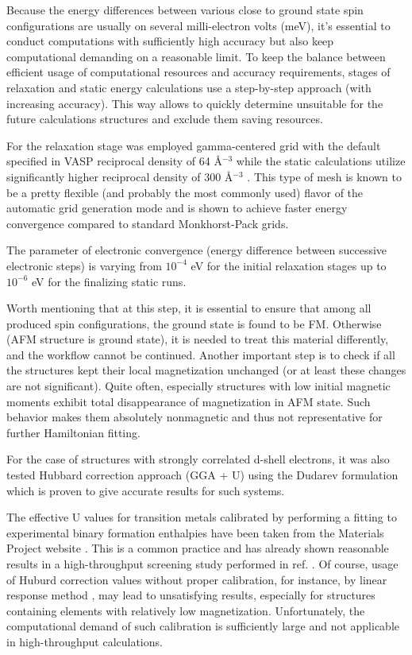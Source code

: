 Because the energy differences between various close to ground state spin configurations are usually on several milli-electron volts (meV), it's essential to conduct computations with sufficiently high accuracy but also keep computational demanding on a reasonable limit. To keep the balance between efficient usage of computational resources and accuracy requirements, stages of relaxation and static energy calculations use a step-by-step approach (with increasing accuracy). This way allows to quickly determine unsuitable for the future calculations structures and exclude them saving resources.

For the relaxation stage was employed gamma-centered grid with the default specified in VASP reciprocal density of 64 \AA $^{−3}$ while the static calculations utilize significantly higher reciprocal density of 300 \AA $^{−3}$ . This type of mesh is known to be a pretty flexible (and probably the most commonly used) flavor of the automatic grid generation mode and is shown to achieve faster energy convergence compared to standard Monkhorst-Pack grids.

The parameter of electronic convergence (energy difference between successive electronic steps) is varying from $10^{-4}$ eV for the initial relaxation stages up to  $10^{-6}$ eV for the finalizing static runs.

Worth mentioning that at this step, it is essential to ensure that among all produced spin configurations, the ground state is found to be FM. Otherwise (AFM structure is ground state), it is needed to treat this material differently, and the workflow cannot be continued.  Another important step is to check if all the structures kept their local magnetization unchanged (or at least these changes are not significant). Quite often, especially structures with low initial magnetic moments exhibit total disappearance of magnetization in AFM state. Such behavior makes them absolutely nonmagnetic and thus not representative for further Hamiltonian fitting.

For the case of structures with strongly correlated d-shell electrons, it was also tested Hubbard correction approach (GGA + U) using the Dudarev \cite{Dudarev_1998} formulation which is proven to give accurate results for such systems.  

The effective U values for transition metals calibrated by performing a fitting to experimental binary formation enthalpies have been taken from the Materials Project website \cite{Wang_2006}.
This is a common practice and has already shown reasonable results in a high-throughput screening study performed in ref. \cite{Zhu_2018}. 
Of course, usage of Huburd correction values without proper calibration, for instance, by linear response method \cite{Cococcioni_2005},  may lead to unsatisfying results, especially for structures containing elements with relatively low magnetization. Unfortunately, the computational demand of such calibration is sufficiently large and not applicable in high-throughput calculations.



